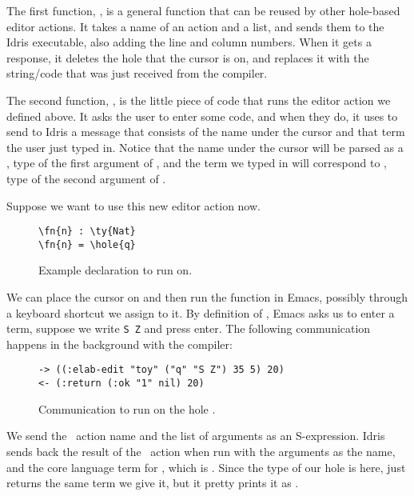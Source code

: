 The first function, , is a general function that can be
reused by other hole-based editor actions. It takes a name of an action and a
list, and sends them to the Idris executable, also adding the line and column
numbers. When it gets a response, it deletes the hole that the cursor is on,
and replaces it with the string/code that was just received from the compiler.

The second function, , is the little piece of code that runs the
 editor action we defined above. It asks the user to enter some code,
and when they do, it uses  to send to Idris a message
that consists of the name under the cursor and that term the user just typed
in. Notice that the name under the cursor will be parsed as a , type
of the first argument of , and the term we typed in will correspond to
\TT, type of the second argument of .

Suppose we want to use this new editor action now.

\begin{figure}[H]
\caption{Example  declaration to run  on.}
\begin{Verbatim}[framesep=2mm, label=\footnotesize{\normalfont{Idris}}, labelposition=topline]
\fn{n} : \ty{Nat}
\fn{n} = \hole{q}
\end{Verbatim}
\end{figure}

We can place the cursor on  and then run the  function in
Emacs, possibly through a keyboard shortcut we assign to it.
By definition of , Emacs asks us to enter a term, suppose we
write \texttt{S Z} and press enter.
The following communication happens in the background with the compiler:

\begin{figure}[H]
  \caption{Communication to run  on the hole .}
\begin{Verbatim}[framesep=2mm, label=\footnotesize{\normalfont{S-expression}}, labelposition=topline]
-> ((:elab-edit "toy" ("q" "S Z") 35 5) 20)
<- (:return (:ok "1" nil) 20)
\end{Verbatim}
\end{figure}

We send the \Elab\ action name  and the list of arguments as an
S-expression. Idris sends back the result of the \Elab\ action when run with
the arguments  as the name, and the core language term for ,
which is . Since the type of our hole is
 here,  just returns the same term we give it, but it pretty
prints it as .

